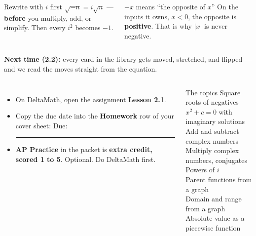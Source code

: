 \documentclass[aspectratio=169, 11pt]{beamer}
\begin{document}
\begin{frame}[t, plain]

  \begin{columns}[T]
      \begin{block}{Rewrite with \(i\) first}
        \(\sqrt{-n} = i\sqrt{n}\) --- \textbf{before} you multiply, add, or simplify.
        Then every \(i^2\) becomes \(-1\).
      \end{block}
      \begin{block}{\(-x\) means ``the opposite of \(x\)''}
        On the inputs it owns, \(x < 0\), the opposite is \textbf{positive}. That is why
        \(|x|\) is never negative.
      \end{block}
  \end{columns}

  \bigskip
  \textbf{Next time (2.2):} every card in the library gets moved, stretched, and flipped ---
  and we read the moves straight from the equation.
\end{frame}

\begin{frame}[t, plain]

  \begin{columns}[T]
      \begin{itemize}\setlength{\itemsep}{6pt}
        \item On DeltaMath, open the assignment \textbf{Lesson 2.1}.
        \item Copy the due date into the \textbf{Homework} row of your cover sheet:
              \quad Due: \rule{3cm}{0.4pt}
        \item \textbf{AP Practice} in the packet is \textbf{extra credit, scored 1 to 5}. Optional.
              Do DeltaMath first.
      \end{itemize}
      \begin{block}{The topics}
        \small
        Square roots of negatives\\
        \(x^2 + c = 0\) with imaginary solutions\\
        Add and subtract complex numbers\\
        Multiply complex numbers, conjugates\\
        Powers of \(i\)\\
        Parent functions from a graph\\
        Domain and range from a graph\\
        Absolute value as a piecewise function
      \end{block}
  \end{columns}
\end{frame}
\end{document}
